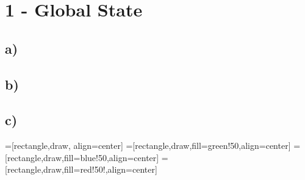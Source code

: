 \documentclass{scrartcl}
\author{Felix Bühler\\2973410 \and Clemens Lieb\\3130838 \and Steffen Wonner\\2862123 \and Fabian Bühler\\2953320}
\title{\gettitle}
\subtitle{\getsubtitle}
\begin{document}
\maketitle

\section*{1 - Global State}
\subsection*{a)}
\subsection*{b)}
\subsection*{c)}

=[rectangle,draw, align=center]
=[rectangle,draw,fill=green!50,align=center]
=[rectangle,draw,fill=blue!50,align=center]
=[rectangle,draw,fill=red!50!,align=center]
\end{document}
